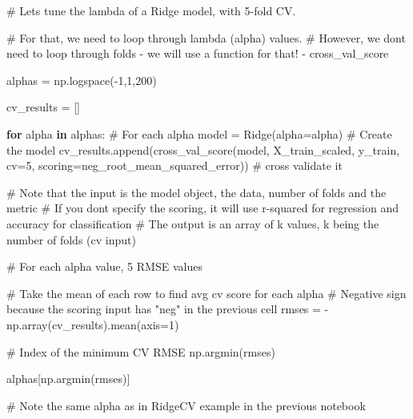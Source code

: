 \documentclass[
  letterpaper,
  DIV=11,
  numbers=noendperiod]{scrreprt}
\newenvironment{Shaded}{\begin{snugshade}}{\end{snugshade}}
\newcommand{\CommentTok}[1]{\textcolor[rgb]{0.37,0.37,0.37}{#1}}
\newcommand{\ControlFlowTok}[1]{\textcolor[rgb]{0.00,0.23,0.31}{\textbf{#1}}}
\newcommand{\DecValTok}[1]{\textcolor[rgb]{0.68,0.00,0.00}{#1}}
\newcommand{\KeywordTok}[1]{\textcolor[rgb]{0.00,0.23,0.31}{\textbf{#1}}}
\newcommand{\NormalTok}[1]{\textcolor[rgb]{0.00,0.23,0.31}{#1}}
\newcommand{\OperatorTok}[1]{\textcolor[rgb]{0.37,0.37,0.37}{#1}}
\newcommand{\StringTok}[1]{\textcolor[rgb]{0.13,0.47,0.30}{#1}}
\begin{document}
\begin{Shaded}
\begin{Highlighting}[]
\CommentTok{\# Let\textquotesingle{}s tune the lambda of a Ridge model, with 5{-}fold CV.}

\CommentTok{\# For that, we need to loop through lambda (alpha) values.}
\CommentTok{\# However, we don\textquotesingle{}t need to loop through folds {-} we will use a function for that! {-} cross\_val\_score}

\NormalTok{alphas }\OperatorTok{=}\NormalTok{ np.logspace(}\OperatorTok{{-}}\DecValTok{1}\NormalTok{,}\DecValTok{1}\NormalTok{,}\DecValTok{200}\NormalTok{)}

\NormalTok{cv\_results }\OperatorTok{=}\NormalTok{ []}

\ControlFlowTok{for}\NormalTok{ alpha }\KeywordTok{in}\NormalTok{ alphas: }\CommentTok{\# For each alpha}
\NormalTok{    model }\OperatorTok{=}\NormalTok{ Ridge(alpha}\OperatorTok{=}\NormalTok{alpha) }\CommentTok{\# Create the model}
\NormalTok{    cv\_results.append(cross\_val\_score(model, X\_train\_scaled, y\_train, cv}\OperatorTok{=}\DecValTok{5}\NormalTok{, scoring}\OperatorTok{=}\StringTok{\textquotesingle{}neg\_root\_mean\_squared\_error\textquotesingle{}}\NormalTok{)) }\CommentTok{\# cross validate it}
    
\CommentTok{\# Note that the input is the model object, the data, number of folds and the metric}
\CommentTok{\# If you don\textquotesingle{}t specify the scoring, it will use r{-}squared for regression and accuracy for classification}
\CommentTok{\# The output is an array of k values, k being the number of folds (cv input)}
\end{Highlighting}
\end{Shaded}

\begin{Shaded}
\begin{Highlighting}[]
\CommentTok{\# For each alpha value, 5 RMSE values}

\CommentTok{\# Take the mean of each row to find avg cv score for each alpha}
\CommentTok{\# Negative sign because the scoring input has "neg" in the previous cell}
\NormalTok{rmses }\OperatorTok{=} \OperatorTok{{-}}\NormalTok{np.array(cv\_results).mean(axis}\OperatorTok{=}\DecValTok{1}\NormalTok{)}

\CommentTok{\# Index of the minimum CV RMSE}
\NormalTok{np.argmin(rmses)}

\NormalTok{alphas[np.argmin(rmses)]}

\CommentTok{\# Note the same alpha as in RidgeCV example in the previous notebook}
\end{Highlighting}
\end{Shaded}
\end{document}
